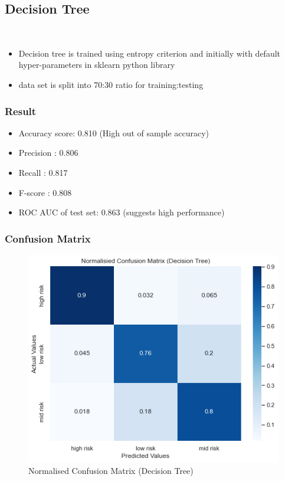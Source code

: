 \documentclass[12pt, letter]{article}
\begin{document}
\subsection{Decision Tree} \\ 
\begin{itemize}
    \item Decision tree is trained using entropy criterion and initially with default hyper-parameters in sklearn python library  
    \item data set is split into 70:30 ratio for training:testing 
\end{itemize}

\subsubsection{Result}
\begin{itemize}
    \item Accuracy score: 0.810 (High out of sample accuracy)
    \item Precision : 0.806 
    \item Recall : 0.817 
    \item F-score : 0.808
    \item ROC AUC of test set: 0.863 (suggests high performance)
\end{itemize}

\subsubsection{Confusion Matrix}
\begin{figure}[h]
    \centering
    \includegraphics[scale = 0.5]{DT_CM.png}
    \caption{Normalised Confusion Matrix (Decision Tree)}
    \label{DT_CM}
\end{figure}
\end{document}
